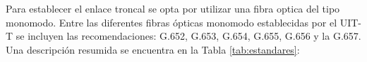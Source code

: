 Para establecer el enlace troncal se opta por utilizar una fibra optica del tipo monomodo. Entre las diferentes fibras ópticas monomodo establecidas por el UIT-T se incluyen las recomendaciones: G.652, G.653, G.654, G.655, G.656 y la G.657. Una descripción resumida se encuentra en la Tabla \ref{tab:estandares}: 
%
%
% 
% 
% 
% 
%
%
%
%
%
%
%





